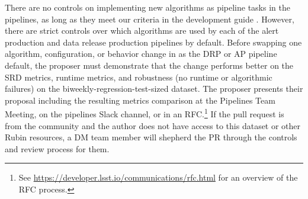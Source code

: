 There are no controls on implementing new algorithms as pipeline tasks in the pipelines, as long as they meet our criteria in the development guide \citep{RubinDevGuide}.
However, there are strict controls over which algorithms are used by each of the alert production and data release production pipelines by default.
Before swapping one algorithm, configuration, or behavior change in as the DRP or AP pipeline default, the proposer must demonstrate that the change performs better on the SRD metrics, runtime metrics, and robustness (no runtime or algorithmic failures) on the biweekly-regression-test-sized dataset.
The proposer presents their proposal including the resulting metrics comparison at the Pipelines Team Meeting, on the pipelines Slack channel, or in an RFC.\footnote{See \url{https://developer.lsst.io/communications/rfc.html} for an overview of the RFC process.}
If the pull request is from the community and the author does not have access to this dataset or other Rubin resources, a DM team member will shepherd the PR through the controls and review process for them.
